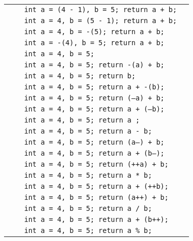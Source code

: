 \begin{longtable}{|p{1cm}|p{5cm}|p{6cm}|p{2.5cm}|}
& & \texttt{int a = (4 - 1), b = 5; return a + b;} & \\
& & \texttt{int a = 4, b = (5 - 1); return a + b;} & \\
& & \texttt{int a = 4, b = -(5); return a + b;} & \\
& & \texttt{int a = -(4), b = 5; return a + b;} & \\
& & \texttt{int a = 4, b = 5;} & \\
& & \texttt{int a = 4, b = 5; return -(a) + b;} & \\
& & \texttt{int a = 4, b = 5; return  b;} & \\
& & \texttt{int a = 4, b = 5; return a + -(b);} & \\
& & \texttt{int a = 4, b = 5; return (--a) + b;} & \\
& & \texttt{int a = 4, b = 5; return a + (--b);} & \\
& & \texttt{int a = 4, b = 5; return a ;} & \\
& & \texttt{int a = 4, b = 5; return a - b;} & \\
& & \texttt{int a = 4, b = 5; return (a--) + b;} & \\
& & \texttt{int a = 4, b = 5; return a + (b--);} & \\
& & \texttt{int a = 4, b = 5; return (++a) + b;} & \\
& & \texttt{int a = 4, b = 5; return a * b;} & \\
& & \texttt{int a = 4, b = 5; return a + (++b);} & \\
& & \texttt{int a = 4, b = 5; return (a++) + b;} & \\
& & \texttt{int a = 4, b = 5; return a / b;} & \\
& & \texttt{int a = 4, b = 5; return a + (b++);} & \\
& & \texttt{int a = 4, b = 5; return a \% b;} & \\
\hline

\end{longtable}
\normalsize
